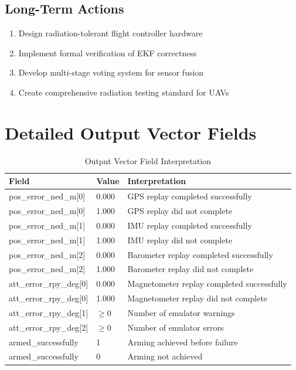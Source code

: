 \documentclass[11pt,a4paper]{article}
\begin{document}
\subsection{Long-Term Actions}

\begin{enumerate}[label=\arabic*)]
  \item Design radiation-tolerant flight controller hardware
  \item Implement formal verification of EKF correctness
  \item Develop multi-stage voting system for sensor fusion
  \item Create comprehensive radiation testing standard for UAVs
\end{enumerate}

\appendix

\section{Detailed Output Vector Fields}

\begin{table}[H]
\centering
\caption{Output Vector Field Interpretation}
\label{tab:output_interpretation}
\begin{tabular}{@{}llp{6cm}@{}}
\toprule
\textbf{Field} & \textbf{Value} & \textbf{Interpretation} \\
\midrule
pos\_error\_ned\_m[0] & 0.000 & GPS replay completed successfully \\
pos\_error\_ned\_m[0] & 1.000 & GPS replay did not complete \\
pos\_error\_ned\_m[1] & 0.000 & IMU replay completed successfully \\
pos\_error\_ned\_m[1] & 1.000 & IMU replay did not complete \\
pos\_error\_ned\_m[2] & 0.000 & Barometer replay completed successfully \\
pos\_error\_ned\_m[2] & 1.000 & Barometer replay did not complete \\
att\_error\_rpy\_deg[0] & 0.000 & Magnetometer replay completed successfully \\
att\_error\_rpy\_deg[0] & 1.000 & Magnetometer replay did not complete \\
att\_error\_rpy\_deg[1] & $\geq$0 & Number of emulator warnings \\
att\_error\_rpy\_deg[2] & $\geq$0 & Number of emulator errors \\
armed\_successfully & 1 & Arming achieved before failure \\
armed\_successfully & 0 & Arming not achieved \\
\bottomrule
\end{tabular}
\end{table}
\end{document}
